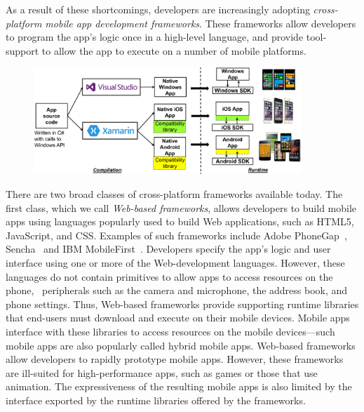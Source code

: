 As a result of these shortcomings, developers are increasingly adopting
\textit{cross-platform mobile app development frameworks}. These frameworks
allow developers to program the app's logic once in a high-level language, and
provide tool-support to allow the app to execute on a number of mobile
platforms. 

\begin{figure}[t!]
\centering
\includegraphics[keepaspectratio=true,width=0.9\textwidth]{figures/xptools-overview.png}
\end{figure}

There are two broad classes of cross-platform frameworks available today.  The
first class, which we call \textit{Web-based frameworks}, allows developers to
build mobile apps using languages popularly used to build Web applications,
such as HTML5, JavaScript, and CSS. Examples of such frameworks include Adobe
PhoneGap~\cite{phonegap}, Sencha~\cite{sencha} and IBM
MobileFirst~\cite{worklight}.  Developers specify the app's logic and user
interface using one or more of the Web-development languages.  However, these
languages do not contain primitives to allow apps to access resources on the
phone, \eg~peripherals such as the camera and microphone, the address book, and
phone settings. Thus, Web-based frameworks provide supporting runtime libraries
that end-users must download and execute on their mobile devices. Mobile apps
interface with these libraries to access resources on the mobile devices---such
mobile apps are also popularly called hybrid mobile apps.  Web-based frameworks
allow developers to rapidly prototype mobile apps.  However, these frameworks
are ill-suited for high-performance apps, such as games or those that use
animation. The expressiveness of the resulting mobile apps is also limited by
the interface exported by the runtime libraries offered by the frameworks.


